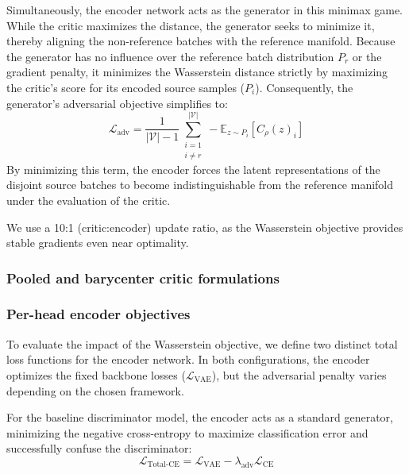 \documentclass[unnumsec,webpdf,contemporary,large]{oup-authoring-template}%
\theoremstyle{thmstyleone}%
\theoremstyle{thmstyletwo}%
\theoremstyle{thmstylethree}%
\begin{document}
Simultaneously, the encoder network acts as the generator in this minimax game. While the critic maximizes the distance, the generator seeks to minimize it, thereby aligning the non-reference batches with the reference manifold. Because the generator has no influence over the reference batch distribution $P_r$ or the gradient penalty, it minimizes the Wasserstein distance strictly by maximizing the critic's score for its encoded source samples ($P_i$). Consequently, the generator's adversarial objective simplifies to:
\begin{equation}
    \mathcal{L}_{\text{adv}} = \frac{1}{\lvert \mathcal{V} \rvert-1} \sum_{\substack{i=1 \\ i \neq r}}^{\lvert \mathcal{V} \rvert} - \mathbb{E}_{z \sim P_i} [C_\rho(z)_i]
    \label{eq:adv}
\end{equation}
By minimizing this term, the encoder forces the latent representations of the disjoint source batches to become indistinguishable from the reference manifold under the evaluation of the critic.

We use a 10:1 (critic:encoder) update ratio, as the Wasserstein objective provides stable gradients even near optimality.

\subsubsection{Pooled and barycenter critic formulations}\label{sec:altcritic}

\subsubsection{Per-head encoder objectives}
To evaluate the impact of the Wasserstein objective, we define two distinct total loss functions for the encoder network. In both configurations, the encoder optimizes the fixed backbone losses ($\mathcal{L}_{\text{VAE}}$), but the adversarial penalty varies depending on the chosen framework.

For the baseline discriminator model, the encoder acts as a standard generator, minimizing the negative cross-entropy to maximize classification error and successfully confuse the discriminator:
\begin{equation*}
    \mathcal{L}_{\text{Total-CE}} = \mathcal{L}_{\text{VAE}} - \lambda_{\text{adv}} \mathcal{L}_{\text{CE}}
\end{equation*}
\end{document}
